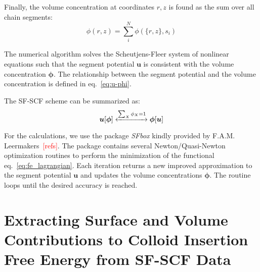 \documentclass[10pt, a4paper]{article}
\newcommand\todo[1]{\textcolor{red}{#1}}
\begin{document}
\begin{multicols}{2}
Finally, the volume concentration at coordinates $r, z$ is found as the sum over all chain segments:
\begin{equation}
    \phi(r, z) = \sum_{i}^{N} \phi(\{r, z\}, s_i)
\end{equation}

The numerical algorithm solves the Scheutjens-Fleer system of nonlinear equations such that the segment potential $\mathbf{u}$ is consistent with the volume concentration $\boldsymbol{\phi}$.
The relationship between the segment potential and the volume concentration is defined in eq.~\ref{eq:u-phi}.

The SF-SCF scheme can be summarized as:
\begin{equation}
    \boldsymbol{u}[\boldsymbol{\phi}] \xleftrightarrow[]{\sum_{X} \phi_X = 1} \boldsymbol{\phi}[\boldsymbol{u}]
\end{equation}

For the calculations, we use the package \emph{SFbox} kindly provided by F.A.M. Leermakers~\todo{[refs]}.
The package contains several Newton/Quasi-Newton optimization routines to perform the minimization of the functional eq.~\ref{eq:fe_lagrangian}.
Each iteration returns a new improved approximation to the segment potential $\mathbf{u}$ and updates the volume concentrations $\mathbf{\phi}$.
The routine loops until the desired accuracy is reached.

\end{multicols}

\section{Extracting Surface and Volume Contributions to Colloid Insertion Free Energy from SF-SCF Data}
\end{document}
